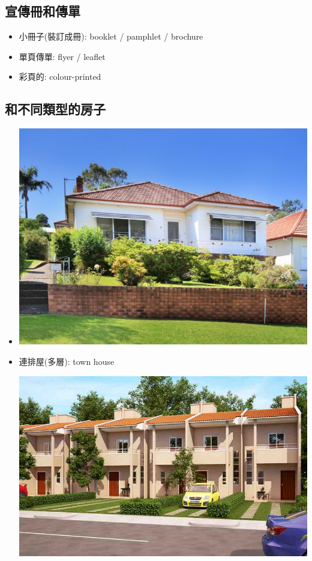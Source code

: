 \subsection{宣傳冊和傳單}
\begin{itemize}
  \itemsep0em
  \item 小冊子(裝訂成冊): booklet / pamphlet / brochure
  \item 單頁傳單: flyer / leaflet
  \item 彩頁的: colour-printed
\end{itemize}

\subsection{和不同類型的房子}
\begin{multicols}{2}
\begin{itemize}
  \itemsep0em
  \item {}
  \begin{center}
    \includegraphics[scale=0.3]{pics/house}
  \end{center}
  \item 連排屋(多層): town house
  \begin{center}
    \includegraphics[scale=0.2]{pics/townhouse}

\end{center}
\end{itemize}
\end{multicols}
